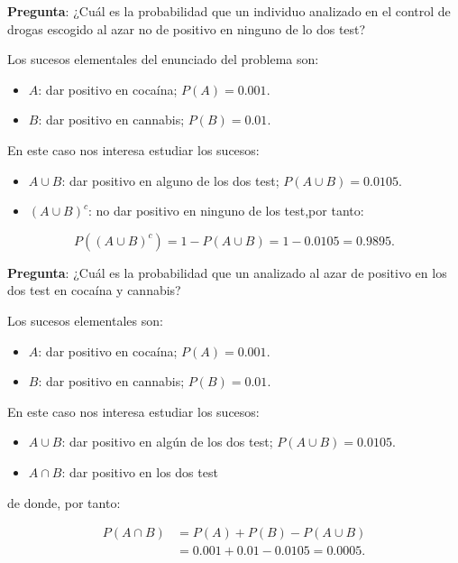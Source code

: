 \documentclass[
  letterpaper,
  DIV=11,
  numbers=noendperiod]{scrreprt}
\providecommand{\tightlist}{%
  \setlength{\itemsep}{0pt}\setlength{\parskip}{0pt}}\usepackage{longtable,booktabs,array}
\begin{document}
\textbf{Pregunta}: ¿Cuál es la probabilidad que un individuo analizado
en el control de drogas escogido al azar no de positivo en ninguno de lo
dos test?

Los sucesos elementales del enunciado del problema son:

\begin{itemize}
\tightlist
\item
  \(A\): dar positivo en cocaína; \(P(A)=0.001.\)
\item
  \(B\): dar positivo en cannabis; \(P(B)=0.01.\)
\end{itemize}

En este caso nos interesa estudiar los sucesos:

\begin{itemize}
\tightlist
\item
  \(A\cup B\): dar positivo en alguno de los dos test;
  \(P(A\cup B)=0.0105.\)
\item
  \((A\cup B)^c\): no dar positivo en ninguno de los test,por tanto:
\end{itemize}

\[P((A\cup B)^c)=1-P(A\cup B)=1-0.0105=0.9895.\]

\textbf{Pregunta}: ¿Cuál es la probabilidad que un analizado al azar de
positivo en los dos test en cocaína y cannabis?

Los sucesos elementales son:

\begin{itemize}
\tightlist
\item
  \(A\): dar positivo en cocaína; \(P(A)=0.001.\)
\item
  \(B\): dar positivo en cannabis; \(P(B)=0.01.\)
\end{itemize}

En este caso nos interesa estudiar los sucesos:

\begin{itemize}
\tightlist
\item
  \(A\cup B\): dar positivo en algún de los dos test;
  \(P(A\cup B)=0.0105.\)
\item
  \(A\cap B\): dar positivo en los dos test
\end{itemize}

de donde, por tanto:

\[\begin{array}{rl}
{P(A\cap B)} &{=P(A)+P(B)-P(A\cup B)}\\ &{=0.001+0.01-0.0105=0.0005}.
\end{array}\]
\end{document}
